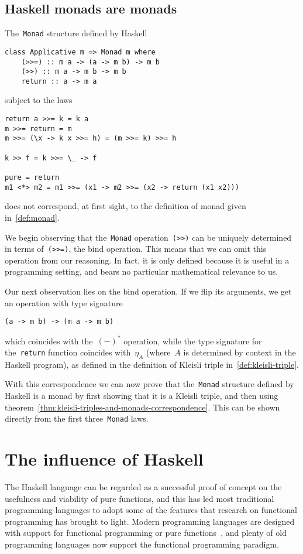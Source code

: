 \documentclass[a4paper]{article}
\theoremstyle{plain}
\theoremstyle{definition}
\begin{document}
\subsection{Haskell monads are monads}
The~\texttt{Monad} structure defined by Haskell
\begin{verbatim}
class Applicative m => Monad m where
    (>>=) :: m a -> (a -> m b) -> m b
    (>>) :: m a -> m b -> m b
    return :: a -> m a
\end{verbatim}
subject to the laws
\begin{verbatim}
return a >>= k = k a
m >>= return = m
m >>= (\x -> k x >>= h) = (m >>= k) >>= h

k >> f = k >>= \_ -> f

pure = return
m1 <*> m2 = m1 >>= (x1 -> m2 >>= (x2 -> return (x1 x2)))
\end{verbatim}
does not correspond, at first sight, to the definition of monad given
in~\ref{def:monad}.

We begin observing that the~\texttt{Monad}
operation~\texttt{(>>)} can be uniquely determined in terms
of~\texttt{(>>=)}, the bind operation.
This means that we can omit this operation from our reasoning. In fact, it is
only defined because it is useful in a programming setting, and bears no
particular mathematical relevance to us.

Our next observation lies on the bind operation. If we flip its arguments, we
get an operation with type signature
\begin{verbatim}
(a -> m b) -> (m a -> m b)
\end{verbatim}
which coincides with the~\((-)^{\ast}\) operation, while the type signature for
the~\texttt{return} function coincides with~\(\eta_{A}\)
(where~\(A\) is determined by context in the Haskell program), as defined in the
definition of Kleisli triple in~\ref{def:kleisli-triple}.

With this correspondence we can now prove that the~\texttt{Monad}
structure defined by Haskell is a monad by first showing that it is a Kleisli
triple, and then using
theorem~\ref{thm:kleisli-triples-and-monads-correspondence}. This can be shown
directly from the first three~\texttt{Monad} laws.

\section{The influence of Haskell}
The Haskell language can be regarded as a successful proof of concept on the
usefulness and viability of pure functions, and this has led most traditional
programming languages to adopt some of the features that research on functional
programming has brought to light. Modern programming languages are designed with
support for functional programming or pure functions~\cite{enwiki:1023837642},
and plenty of old programming languages now support the functional programming
paradigm.
\end{document}
